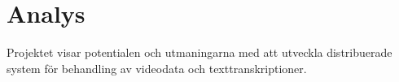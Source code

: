 \chapter{Analys}
Projektet visar potentialen och utmaningarna med att utveckla distribuerade
system för behandling av videodata och texttranskriptioner.

